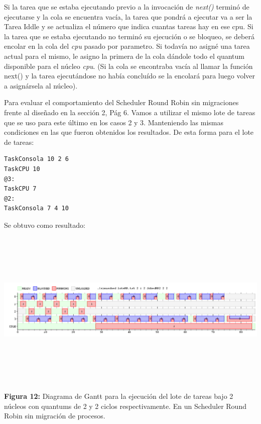\documentclass[a4paper]{article}
\begin{document}
Si la tarea que se estaba ejecutando previo a la invocaci\'on de \emph{next()} termin\'o de ejecutarse y la cola se encuentra vac\'ia, la tarea que pondr\'a a ejecutar va a ser la Tarea Iddle y se actualiza el número que indica cuantas tareas hay en ese cpu.
Si la tarea que se estaba ejecutando no termin\'o su ejecuci\'on o se bloqueo, se deber\'a encolar en la cola del \emph{cpu} pasado por parametro.
Si todav\'ia no asign\'e una tarea actual para el mismo, le asigno la primera de la cola d\'andole todo el quantum disponible para el n\'ucleo \emph{cpu}. (Si la cola se encontraba vac\'ia al llamar la funci\'on next() y la tarea ejecut\'andose no hab\'ia conclu\'ido se la encolar\'a para luego volver a asign\'arsela al n\'ucleo).\\
 
\bigskip 
 
Para evaluar el comportamiento del Scheduler Round Robin sin migraciones frente al diseñado en la sección 2, Pág 6. Vamos a utilizar el mismo lote de tareas que se uso para este último en los casos 2 y 3. Manteniendo las mismas condiciones en las que fueron obtenidos los resultados.\newline
De esta forma para el lote de tareas:
 
 \begin{codesnippet}
	\begin{verbatim}
TaskConsola 10 2 6
TaskCPU 10
@3:
TaskCPU 7
@2:
TaskConsola 7 4 10
	\end{verbatim}
	\end{codesnippet}
	
Se obtuvo como resultado:	

\includegraphics[width=\textwidth,height=3.0in,keepaspectratio
]{imagenes/ej8/2eje1.png} \newline
\begin {flushleft}
\textbf{Figura 12:} Diagrama de Gantt para la ejecuci\'on del lote de tareas bajo 2 n\'ucleos con quantums de 2 y 2 ciclos respectivamente. En un Scheduler Round Robin sin migración de procesos.
\end{flushleft}	
 
\end{document}
